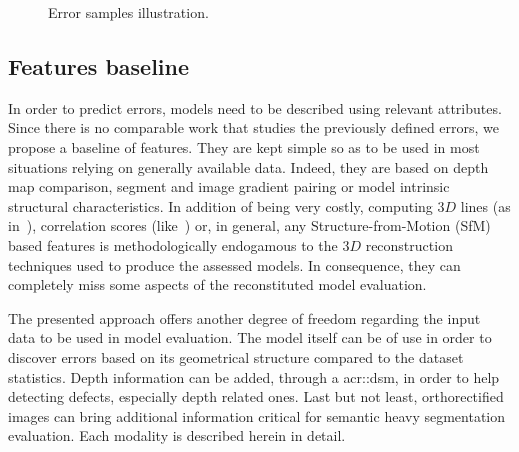 \documentclass[runningheads]{llncs}
\newcounter{SubFigCounter}
\begin{document}
\begin{figure}
\begin{center}
{{                    \label{fig::fac_err}
                    \addtocounter{figure}{-1}
                }
            }
            {
                \caption{\label{fig::samples}Error samples illustration.}
            }
        \end{center}
        \vspace{-4.5em}
    \end{figure}

\subsection{Features baseline}
In order to predict errors, models need to be described using relevant attributes. Since there is no comparable work that studies the previously defined errors, we propose a baseline of features. They are kept simple so as to be used in most situations relying on generally available data. Indeed, they are based on depth map comparison, segment and image gradient pairing or model intrinsic structural characteristics. In addition of being very costly, computing $3D$ lines (as in~\cite{Michelin2013}), correlation scores (like~\cite{boudet2006supervised}) or, in general, any Structure-from-Motion (SfM) based features is methodologically endogamous to the $3D$ reconstruction techniques used to produce the assessed models. In consequence, they can completely miss some aspects of the reconstituted model evaluation.

The presented approach offers another degree of freedom regarding the input data to be used in model evaluation. The model itself can be of use in order to discover errors based on its geometrical structure compared to the dataset statistics. Depth information can be added, through a \acrshort{acr::dsm}, in order to help detecting defects, especially depth related ones. Last but not least, orthorectified images can bring additional information critical for semantic heavy segmentation evaluation. Each modality is described herein in detail.
\end{document}
